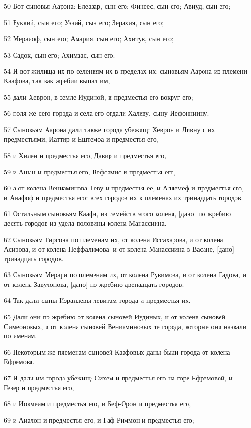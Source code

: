 \par 50 Вот сыновья Аарона: Елеазар, сын его; Финеес, сын его; Авиуд, сын его;
\par 51 Буккий, сын его; Уззий, сын его; Зерахия, сын его;
\par 52 Мераиоф, сын его; Амария, сын его; Ахитув, сын его;
\par 53 Садок, сын его; Ахимаас, сын его.
\par 54 И вот жилища их по селениям их в пределах их: сыновьям Аарона из племени Каафова, так как жребий выпал им,
\par 55 дали Хеврон, в земле Иудиной, и предместья его вокруг его;
\par 56 поля же сего города и села его отдали Халеву, сыну Иефонниину.
\par 57 Сыновьям Аарона дали также города убежищ: Хеврон и Ливну с их предместьями, Иаттир и Ештемоа и предместья его,
\par 58 и Хилен и предместья его, Давир и предместья его,
\par 59 и Ашан и предместья его, Вефсамис и предместья его,
\par 60 а от колена Вениаминова--Геву и предместья ее, и Аллемеф и предместья его, и Анафоф и предместья его: всех городов их в племенах их тринадцать городов.
\par 61 Остальным сыновьям Каафа, из семейств этого колена, [дано] по жребию десять городов из удела половины колена Манассиина.
\par 62 Сыновьям Гирсона по племенам их, от колена Иссахарова, и от колена Асирова, и от колена Неффалимова, и от колена Манассиина в Васане, [дано] тринадцать городов.
\par 63 Сыновьям Мерари по племенам их, от колена Рувимова, и от колена Гадова, и от колена Завулонова, [дано] по жребию двенадцать городов.
\par 64 Так дали сыны Израилевы левитам города и предместья их.
\par 65 Дали они по жребию от колена сыновей Иудиных, и от колена сыновей Симеоновых, и от колена сыновей Вениаминовых те города, которые они назвали по именам.
\par 66 Некоторым же племенам сыновей Каафовых даны были города от колена Ефремова.
\par 67 И дали им города убежищ: Сихем и предместья его на горе Ефремовой, и Гезер и предместья его,
\par 68 и Иокмеам и предместья его, и Беф-Орон и предместья его,
\par 69 и Аиалон и предместья его, и Гаф-Риммон и предместья его;
